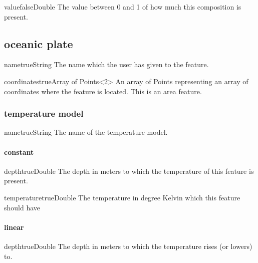 \documentclass{book}
\begin{document}
\begin{parameterbox}{value}{false}{Double}{}
The value between 0 and 1 of how much this composition is present.
\end{parameterbox}

\subsection{oceanic plate}
\begin{parameterbox}{name}{true}{String}{}
The name which the user has given to the feature.
\end{parameterbox}

\begin{parameterbox}{coordinates}{true}{Array of Points<2>}{}
An array of Points representing an array of coordinates where the feature is located. This is an area feature.
\end{parameterbox}

\subsubsection{temperature model}
\begin{parameterbox}{name}{true}{String}{}
The name of the temperature model.
\end{parameterbox}

\paragraph{constant}
\begin{parameterbox}{depth}{true}{Double}{}
The depth in meters to which the temperature of this feature is present.
\end{parameterbox}

\begin{parameterbox}{temperature}{true}{Double}{}
The temperature in degree Kelvin which this feature should have
\end{parameterbox}

\paragraph{linear}
\begin{parameterbox}{depth}{true}{Double}{}
The depth in meters to which the temperature rises (or lowers) to.
\end{parameterbox}
\end{document}
